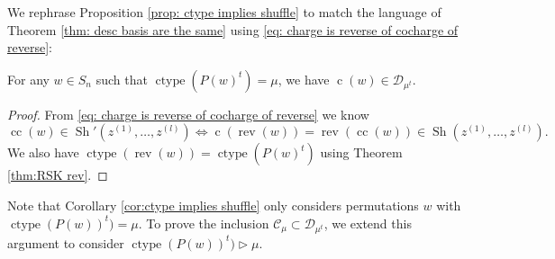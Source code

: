 \documentclass[ALCO, Unicode]{cedram}
\DeclareMathOperator{\ctype}{ctype}
\DeclareMathOperator{\sh}{Sh}
\DeclareMathOperator{\rev}{rev}
\DeclareMathOperator{\cc}{cc}
\DeclareMathOperator{\cw}{c}
\begin{document}
We rephrase Proposition \ref{prop: ctype implies shuffle} to match the language of Theorem \ref{thm: desc basis are the same} using \eqref{eq: charge is reverse of cocharge of reverse}:

\begin{coro}\label{cor:ctype implies shuffle}
    For any $w\in S_n$ such that $\ctype(P(w)^t) =\mu$, we have $\cw(w)\in \mathcal{D}_{\mu^t}$.
\end{coro}
\begin{proof}
    From  \eqref{eq: charge is reverse of cocharge of reverse} we know  \[\cc(w) \in \sh'(z^{(1)},\dots , z^{(l)}) \Leftrightarrow\cw(\rev(w))= \rev(\cc(w)) \in \sh(z^{(1)},\dots , z^{(l)}).\]
    We also have $\ctype(\rev(w)) = \ctype(P(w)^t)$ using Theorem \ref{thm:RSK rev}.
\end{proof}

Note that Corollary \ref{cor:ctype implies shuffle} only considers permutations $w$ with $\ctype(P(w))^t) = \mu$. To prove the inclusion $\mathcal{C}_\mu \subset \mathcal{D}_{\mu^t}$, we extend this argument to consider $\ctype(P(w))^t) \rhd  \mu$.
\end{document}
